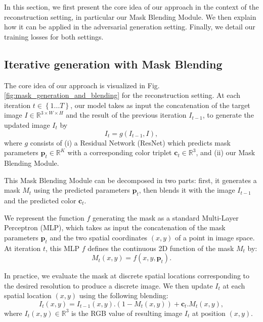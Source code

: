 \documentclass[10pt,twocolumn,letterpaper]{article}
\begin{document}
In this section, we first present the core idea of our approach in the context of the reconstruction setting, in particular our Mask Blending Module.
We then explain how it can be applied in the adversarial generation setting.
Finally, we detail our training losses for both settings. 

\subsection{Iterative generation with Mask Blending}

The core idea of our approach is visualized in Fig. \ref{fig:mask_generation_and_blending} for the reconstruction setting. At each iteration $t\in \left\lbrace 1...T\right\rbrace$, our model takes as input the concatenation of the target image $I \in \mathbb{R}^{3\times W\times H}$ and the result of the previous iteration $I_{t-1}$, to generate the updated image $I_t$ by
\begin{equation}
I_t = g(I_{t-1}, I),
\label{eq:aeset}
\end{equation} where $g$ consists of (i) 
a Residual Network (ResNet) which predicts mask parameters $\mathbf{p}_t\in \mathbb{R}^K$ with a corresponding color triplet $\mathbf{c}_t\in \mathbb{R}^3$, and (ii) our Mask Blending Module. 

This Mask Blending Module can be decomposed in two parts: first, it generates a mask $M_t$ using the predicted parameters $\mathbf{p}_t$, then blends it with the image $I_{t-1}$ and the predicted color $\mathbf{c}_t$.

We represent the function $f$ generating the mask as a standard Multi-Layer Perceptron (MLP), which takes as input the concatenation of the mask parameters $\mathbf{p}_t$ and the two spatial coordinates $(x,y)$ of a point in image space. At iteration $t$, this MLP $f$ defines the continuous 2D function of the mask $M_t$ by:
\begin{equation}
    M_t(x,y) = f(x,y,\mathbf{p}_t).
\end{equation}

In practice, we evaluate the mask at discrete spatial locations corresponding to the desired resolution to produce a discrete image.
We then update $I_{t}$ at each spatial location $(x,y)$ using the following blending: 
\begin{equation}
I_{t}(x,y) = I_{t-1}(x,y).(1-M_{t}(x,y)) + \mathbf{c}_t.M_{t}(x,y),
\label{alpha_blending}
\end{equation}
where $I_{t}(x,y)\in \mathbb{R}^3$ is the RGB value of resulting image $I_t$ at position $(x,y)$.
\end{document}
